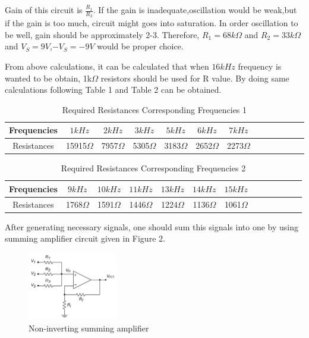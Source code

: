 \documentclass[letterpaper,12pt]{article}
\begin{document}
Gain of this circuit is \(\frac{R_1}{R_2}\). If the gain is inadequate,oscillation would be weak,but if the gain is too much, circuit might goes into saturation. In order oscillation to be well, gain should be approximately 2-3. Therefore, \(R_1 = 68k\Omega\) and \(R_2 = 33k\Omega\) and \(V_S = 9V\),\(-V_S = -9V\) would be proper choice.

From above calculations, it can be calculated that when \(16kHz\) frequency is wanted to be obtain, 1k\(\Omega \) resistors should be used for R value. By doing same calculations following Table 1 and Table 2 can be obtained.
\begin{table}[H]
    \begin{center}
        \caption{Required Resistances Corresponding Frequencies 1}
        \vspace{2mm}
        \begin{tabular}{||c | c | c | c| c| c| c| c| c| c| c| c| c||} 
            \hline
            Frequencies &\(1kHz\) & \(2kHz\) & \(3kHz\)& \(5kHz\)& \(6kHz\)& \(7kHz\)\\ [0.5ex] 
            \hline\hline
            Resistances &15915\(\Omega\) & 7957\(\Omega\) & 5305\(\Omega\)& 3183\(\Omega\)& 2652\(\Omega\)& 2273\(\Omega\)\\
            \hline
        \end{tabular}
    \end{center}
\end{table}  
\begin{table}[H]
    \begin{center}
        \caption{Required Resistances Corresponding Frequencies 2}
        \vspace{2mm}
        \begin{tabular}{||c | c | c | c| c| c| c| c| c| c| c| c| c||} 
            \hline
            Frequencies &\(9kHz\)& \(10kHz\)& \(11kHz\)& \(13kHz\)& \(14kHz\)& \(15kHz\)\\ [0.5ex] 
            \hline\hline
            Resistances &1768\(\Omega\)& 1591\(\Omega\)& 1446\(\Omega\)& 1224\(\Omega\)& 1136\(\Omega\)& 1061\(\Omega\)\\
            \hline
        \end{tabular}
    \end{center}
\end{table}  

After generating necessary signals, one should sum this signals into one by using summing amplifier circuit given in Figure 2. 
\begin{figure}[H]
    \centering
    \includegraphics[width = 0.35\textwidth]{Non-Inv-Sum-Amp.jpg}
    \caption{Non-inverting summing amplifier}
\end{figure} 
\end{document}
